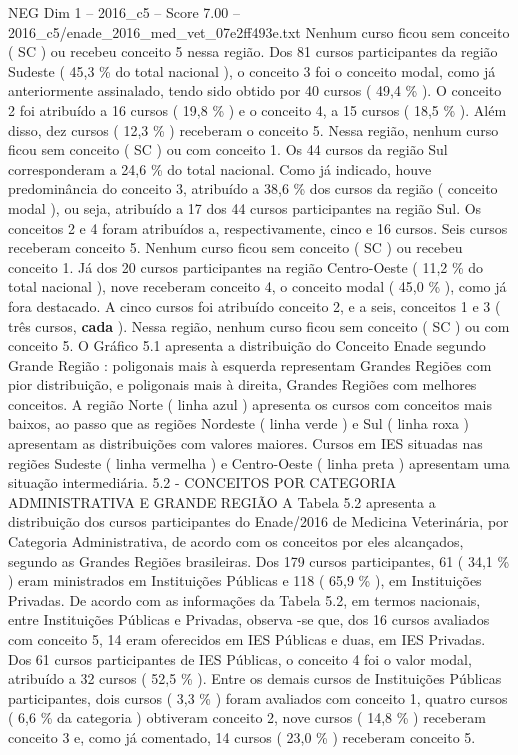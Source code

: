 \begin{textsample}{NEG Dim 1 – 2016\_c5 – Score 7.00 – 2016\_c5/enade\_2016\_med\_vet\_07e2ff493e.txt}
Nenhum curso ficou sem conceito ( SC ) ou recebeu conceito 5 nessa região.
Dos 81 cursos participantes da região Sudeste ( 45,3 \% do total nacional ), o conceito 3 foi o conceito modal, como já anteriormente assinalado, tendo sido obtido por 40 cursos ( 49,4 \% ).
O conceito 2 foi atribuído a 16 cursos ( 19,8 \% ) e o conceito 4, a 15 cursos ( 18,5 \% ).
Além disso, dez cursos ( 12,3 \% ) receberam o conceito 5.
Nessa região, nenhum curso ficou sem conceito ( SC ) ou com conceito 1.
Os 44 cursos da região Sul corresponderam a 24,6 \% do total nacional.
Como já indicado, houve predominância do conceito 3, atribuído a 38,6 \% dos cursos da região ( conceito modal ), ou seja, atribuído a 17 dos 44 cursos participantes na região Sul.
Os conceitos 2 e 4 foram atribuídos a, respectivamente, cinco e 16 cursos.
Seis cursos receberam conceito 5.
Nenhum curso ficou sem conceito ( SC ) ou recebeu conceito 1.
Já dos 20 cursos participantes na região Centro-Oeste ( 11,2 \% do total nacional ), nove receberam conceito 4, o conceito modal ( 45,0 \% ), como já fora destacado.
A cinco cursos foi atribuído conceito 2, e a seis, conceitos 1 e 3 ( três cursos, \textbf{cada} ).
Nessa região, nenhum curso ficou sem conceito ( SC ) ou com conceito 5.
O Gráfico 5.1 apresenta a distribuição do Conceito Enade segundo Grande Região : poligonais mais à esquerda representam Grandes Regiões com pior distribuição, e poligonais mais à direita, Grandes Regiões com melhores conceitos.
A região Norte ( linha azul ) apresenta os cursos com conceitos mais baixos, ao passo que as regiões Nordeste ( linha verde ) e Sul ( linha roxa ) apresentam as distribuições com valores maiores.
Cursos em IES situadas nas regiões Sudeste ( linha vermelha ) e Centro-Oeste ( linha preta ) apresentam uma situação intermediária. 5.2 - CONCEITOS POR CATEGORIA ADMINISTRATIVA E GRANDE REGIÃO A Tabela 5.2 apresenta a distribuição dos cursos participantes do Enade/2016 de Medicina Veterinária, por Categoria Administrativa, de acordo com os conceitos por eles alcançados, segundo as Grandes Regiões brasileiras.
Dos 179 cursos participantes, 61 ( 34,1 \% ) eram ministrados em Instituições Públicas e 118 ( 65,9 \% ), em Instituições Privadas.
De acordo com as informações da Tabela 5.2, em termos nacionais, entre Instituições Públicas e Privadas, observa -se que, dos 16 cursos avaliados com conceito 5, 14 eram oferecidos em IES Públicas e duas, em IES Privadas.
Dos 61 cursos participantes de IES Públicas, o conceito 4 foi o valor modal, atribuído a 32 cursos ( 52,5 \% ).
Entre os demais cursos de Instituições Públicas participantes, dois cursos ( 3,3 \% ) foram avaliados com conceito 1, quatro cursos ( 6,6 \% da categoria ) obtiveram conceito 2, nove cursos ( 14,8 \% ) receberam conceito 3 e, como já comentado, 14 cursos ( 23,0 \% ) receberam conceito 5.

\end{textsample}
